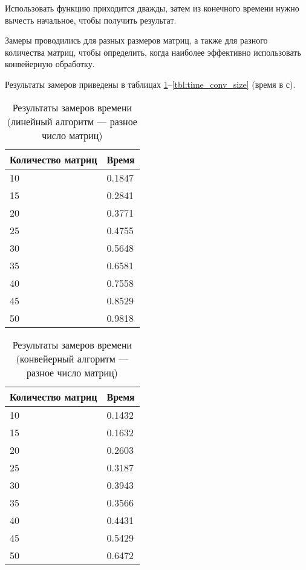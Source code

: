 Использовать функцию приходится дважды, затем из конечного времени нужно вычесть начальное, чтобы получить результат.

Замеры проводились для разных размеров матриц, а также для разного количества матриц, чтобы определить, когда наиболее эффективно использовать конвейерную обработку.

Результаты замеров приведены в таблицах \ref{tbl:time_lin_count}--\ref{tbl:time_conv_size} (время в с).

\begin{table}[h]
	\begin{center}
		\begin{threeparttable}
			\captionsetup{justification=raggedright,singlelinecheck=off}
			\caption{Результаты замеров времени (линейный алгоритм --- разное число матриц)}
			\label{tbl:time_lin_count}
			\begin{tabular}{|p{6cm}|p{6cm}|}
				\hline
				Количество матриц & Время \\
				\hline
				10 & 0.1847 \\ \hline 
				15 & 0.2841 \\ \hline 
				20 & 0.3771 \\ \hline 
				25 & 0.4755 \\ \hline 
				30 & 0.5648 \\ \hline 
				35 & 0.6581 \\ \hline 
				40 & 0.7558 \\ \hline 
				45 & 0.8529 \\ \hline 
				50 & 0.9818 \\ \hline  
			\end{tabular}
		\end{threeparttable}
	\end{center}
\end{table}


\begin{table}[h]
	\begin{center}
		\begin{threeparttable}
			\captionsetup{justification=raggedright,singlelinecheck=off}
			\caption{Результаты замеров времени (конвейерный алгоритм --- разное число матриц)}
			\label{tbl:time_conv_count}
			\begin{tabular}{|p{6cm}|p{6cm}|}
				\hline
				Количество матриц & Время \\
				\hline
				10 & 0.1432 \\ \hline 
				15 & 0.1632 \\ \hline 
				20 & 0.2603 \\ \hline 
				25 & 0.3187 \\ \hline 
				30 & 0.3943 \\ \hline 
				35 & 0.3566 \\ \hline 
				40 & 0.4431 \\ \hline 
				45 & 0.5429 \\ \hline 
				50 & 0.6472 \\ \hline 
				
			\end{tabular}
		\end{threeparttable}
	\end{center}
\end{table}


